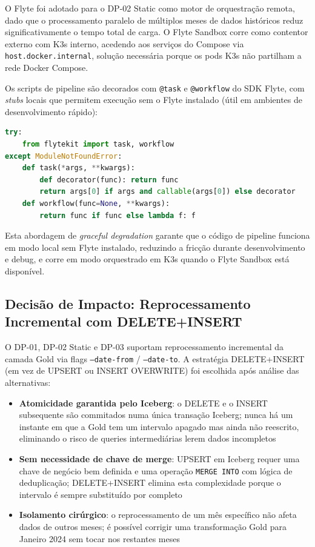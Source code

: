 \documentclass[11pt,a4paper]{article}
\begin{document}
O Flyte foi adotado para o DP-02 Static como motor de orquestração remota, dado que o processamento paralelo de múltiplos meses de dados históricos reduz significativamente o tempo total de carga. O Flyte Sandbox corre como contentor externo com K3s interno, acedendo aos serviços do Compose via \texttt{host.docker.internal}, solução necessária porque os pods K3s não partilham a rede Docker Compose.

Os scripts de pipeline são decorados com \texttt{@task} e \texttt{@workflow} do SDK Flyte, com \textit{stubs} locais que permitem execução sem o Flyte instalado (útil em ambientes de desenvolvimento rápido):

\begin{lstlisting}[language=Python]
try:
    from flytekit import task, workflow
except ModuleNotFoundError:
    def task(*args, **kwargs):
        def decorator(func): return func
        return args[0] if args and callable(args[0]) else decorator
    def workflow(func=None, **kwargs):
        return func if func else lambda f: f
\end{lstlisting}

Esta abordagem de \textit{graceful degradation} garante que o código de pipeline funciona em modo local sem Flyte instalado, reduzindo a fricção durante desenvolvimento e debug, e corre em modo orquestrado em K3s quando o Flyte Sandbox está disponível.

\subsection{Decisão de Impacto: Reprocessamento Incremental com DELETE+INSERT}

O DP-01, DP-02 Static e DP-03 suportam reprocessamento incremental da camada Gold via flags \texttt{--date-from} / \texttt{--date-to}. A estratégia DELETE+INSERT (em vez de UPSERT ou INSERT OVERWRITE) foi escolhida após análise das alternativas:

\begin{itemize}[leftmargin=*,noitemsep]
  \item \textbf{Atomicidade garantida pelo Iceberg}: o DELETE e o INSERT subsequente são commitados numa única transação Iceberg; nunca há um instante em que a Gold tem um intervalo apagado mas ainda não reescrito, eliminando o risco de queries intermediárias lerem dados incompletos
  \item \textbf{Sem necessidade de chave de merge}: UPSERT em Iceberg requer uma chave de negócio bem definida e uma operação \texttt{MERGE INTO} com lógica de deduplicação; DELETE+INSERT elimina esta complexidade porque o intervalo é sempre substituído por completo
  \item \textbf{Isolamento cirúrgico}: o reprocessamento de um mês específico não afeta dados de outros meses; é possível corrigir uma transformação Gold para Janeiro 2024 sem tocar nos restantes meses
\end{itemize}
\end{document}
